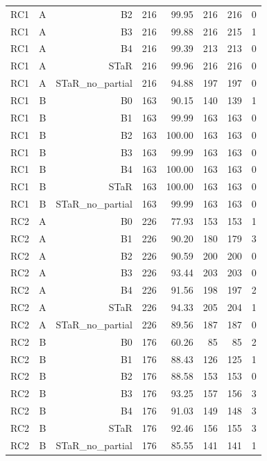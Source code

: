 \begin{longtable}{@{}lrrrrrrr@{}}
RC1 & A & B2 & 216 & 99.95 & 216 & 216 & 0 \\
RC1 & A & B3 & 216 & 99.88 & 216 & 215 & 1 \\
RC1 & A & B4 & 216 & 99.39 & 213 & 213 & 0 \\
RC1 & A & STaR & 216 & 99.96 & 216 & 216 & 0 \\
RC1 & A & STaR\_no\_partial & 216 & 94.88 & 197 & 197 & 0 \\
RC1 & B & B0 & 163 & 90.15 & 140 & 139 & 1 \\
RC1 & B & B1 & 163 & 99.99 & 163 & 163 & 0 \\
RC1 & B & B2 & 163 & 100.00 & 163 & 163 & 0 \\
RC1 & B & B3 & 163 & 99.99 & 163 & 163 & 0 \\
RC1 & B & B4 & 163 & 100.00 & 163 & 163 & 0 \\
RC1 & B & STaR & 163 & 100.00 & 163 & 163 & 0 \\
RC1 & B & STaR\_no\_partial & 163 & 99.99 & 163 & 163 & 0 \\
RC2 & A & B0 & 226 & 77.93 & 153 & 153 & 1 \\
RC2 & A & B1 & 226 & 90.20 & 180 & 179 & 3 \\
RC2 & A & B2 & 226 & 90.59 & 200 & 200 & 0 \\
RC2 & A & B3 & 226 & 93.44 & 203 & 203 & 0 \\
RC2 & A & B4 & 226 & 91.56 & 198 & 197 & 2 \\
RC2 & A & STaR & 226 & 94.33 & 205 & 204 & 1 \\
RC2 & A & STaR\_no\_partial & 226 & 89.56 & 187 & 187 & 0 \\
RC2 & B & B0 & 176 & 60.26 & 85 & 85 & 2 \\
RC2 & B & B1 & 176 & 88.43 & 126 & 125 & 1 \\
RC2 & B & B2 & 176 & 88.58 & 153 & 153 & 0 \\
RC2 & B & B3 & 176 & 93.25 & 157 & 156 & 3 \\
RC2 & B & B4 & 176 & 91.03 & 149 & 148 & 3 \\
RC2 & B & STaR & 176 & 92.46 & 156 & 155 & 3 \\
RC2 & B & STaR\_no\_partial & 176 & 85.55 & 141 & 141 & 1 \\
\bottomrule
\end{longtable}
\endgroup
